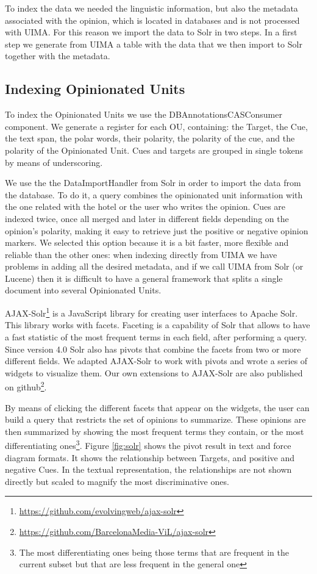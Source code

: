 \documentclass{llncs}
\begin{document}
To index the data we needed the linguistic information, but also the metadata associated with the opinion, which is located in databases and is not processed with UIMA. For this reason we import the data to Solr in two steps. In a first step we generate from UIMA a table with the data that we then import to Solr together with the metadata.

\subsection{Indexing Opinionated Units}

To index the Opinionated Units we use the DBAnnotationsCASConsumer component. We generate a register for each OU, containing: the Target, the Cue, the text span, the polar words, their polarity, the polarity of the cue, and the polarity of the Opinionated Unit. Cues and targets are grouped in single tokens by means of underscoring.

We use the the DataImportHandler from Solr in order to import the data from the database. To do it, a query combines the opinionated unit information with the one related with the hotel or the user who writes the opinion. Cues are indexed twice, once all merged and later in different fields depending on the opinion's polarity, making it easy to retrieve just the positive or negative opinion markers. We selected this option because it is a bit faster, more flexible and reliable than the other ones: when indexing directly from UIMA we have problems in adding all the desired metadata, and if we call UIMA from Solr (or Lucene) then it is difficult to have a general framework that splits a single document into several Opinionated Units.

AJAX-Solr\footnote{\url{https://github.com/evolvingweb/ajax-solr}} is a JavaScript library for creating user interfaces to Apache Solr. This library works with facets. Faceting is a capability of Solr that allows to have a fast statistic of the most frequent terms in each field, after performing a query. Since version 4.0 Solr also has pivots that combine the facets from two or more different fields. We adapted AJAX-Solr to work with pivots and wrote a series of widgets to visualize them. Our own extensions to AJAX-Solr are also published on github\footnote{\url{https://github.com/BarcelonaMedia-ViL/ajax-solr}}.

By means of clicking the different facets that appear on the widgets, the user can build a query that restricts the set of opinions to summarize. These opinions are then summarized by showing the most frequent terms they contain, or the most differentiating ones\footnote{The most differentiating ones being those terms that are frequent in the current subset but that are less frequent in the general one}. Figure \ref{fig:solr} shows the pivot result in text and force diagram formats. It shows the relationship between Targets, and positive and negative Cues. In the textual representation, the relationships are not shown directly but scaled to magnify the most discriminative ones. 
\end{document}
